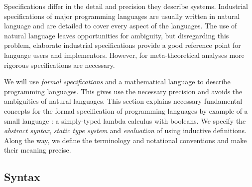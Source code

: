 {%

Specifications differ in the detail and precision they describe systems.
Industrial specifications of major programming languages are usually written in
natural language and are detailed to cover every aspect of the languages. The
use of natural language leaves opportunities for ambiguity, but disregarding
this problem, elaborate industrial specifications provide a good reference point
for language users and implementors. However, for meta-theoretical analyses more
rigorous specifications are necessary.

We will use \emph{formal specifications} and a mathematical language to
describe programming languages. This gives use the necessary precision and
avoids the ambiguities of natural languages. This section explains necessary
fundamental concepts for the formal specification of programming languages by
example of a small language \stlcbool: a simply-typed lambda calculus with
booleans. We specify the \emph{abstract syntax}, \emph{static type system} and
\emph{evaluation} of \stlcbool using inductive definitions. Along the way, we
define the terminology and notational conventions and make their meaning
precise.

\subsection{Syntax}\label{ssec:intro:syntax}

}
